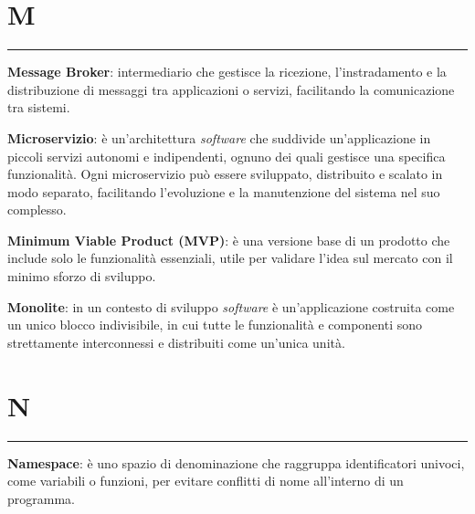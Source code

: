 \section*{M}
{\color{lightgray}\rule{\textwidth}{0.4pt}} %
\begin{glossaryitemize}
    \item \textbf{Message Broker}: intermediario che gestisce la ricezione, l'instradamento e la distribuzione di messaggi tra applicazioni o servizi, facilitando la comunicazione tra sistemi.
    \item \textbf{Microservizio}: è un'architettura \textit{software} che suddivide un'applicazione in piccoli servizi autonomi e indipendenti, ognuno dei quali gestisce una specifica funzionalità. Ogni microservizio può essere sviluppato, distribuito e scalato in modo separato, facilitando l'evoluzione e la manutenzione del sistema nel suo complesso.
    \item \textbf{Minimum Viable Product (MVP)}: è una versione base di un prodotto che include solo le funzionalità essenziali, utile per validare l'idea sul mercato con il minimo sforzo di sviluppo.
    \item \textbf{Monolite}: in un contesto di sviluppo \textit{software} è un'applicazione costruita come un unico blocco indivisibile, in cui tutte le funzionalità e componenti sono strettamente interconnessi e distribuiti come un'unica unità.
\end{glossaryitemize}

\section*{N}
{\color{lightgray}\rule{\textwidth}{0.4pt}} %
\begin{glossaryitemize}
    \item \textbf{Namespace}: è uno spazio di denominazione che raggruppa identificatori univoci, come variabili o funzioni, per evitare conflitti di nome all'interno di un programma.
\end{glossaryitemize}

